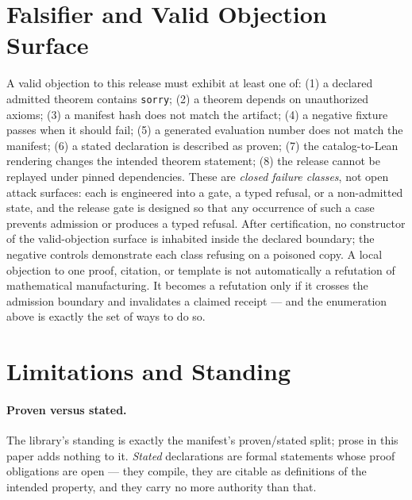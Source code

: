 \documentclass[11pt]{article}
\newif\ifreleasebuild
\begin{document}
\ifreleasebuild
  
\else
\fi

\section{Falsifier and Valid Objection Surface}
\label{sec:falsifier}

A valid objection to this release must exhibit at least one of:
(1) a declared admitted theorem contains \texttt{sorry};
(2) a theorem depends on unauthorized axioms;
(3) a manifest hash does not match the artifact;
(4) a negative fixture passes when it should fail;
(5) a generated evaluation number does not match the manifest;
(6) a stated declaration is described as proven;
(7) the catalog-to-Lean rendering changes the intended theorem statement;
(8) the release cannot be replayed under pinned dependencies.
These are \emph{closed failure classes}, not open attack surfaces: each
is engineered into a gate, a typed refusal, or a non-admitted state, and
the release gate is designed so that any occurrence of such a case
prevents admission or produces a typed refusal. After certification, no
constructor of the valid-objection surface is inhabited inside the
declared boundary; the negative controls demonstrate each class refusing
on a poisoned copy. A local objection to one proof, citation, or template
is not automatically a refutation of mathematical manufacturing. It
becomes a refutation only if it crosses the admission boundary and
invalidates a claimed receipt --- and the enumeration above is exactly
the set of ways to do so.

\section{Limitations and Standing}
\label{sec:limitations}

\paragraph{Proven versus stated.}
The library's standing is exactly the manifest's proven/stated split; prose
in this paper adds nothing to it. \emph{Stated} declarations are formal
statements whose proof obligations are open --- they compile, they are
citable as definitions of the intended property, and they carry no more
authority than that.
\end{document}
